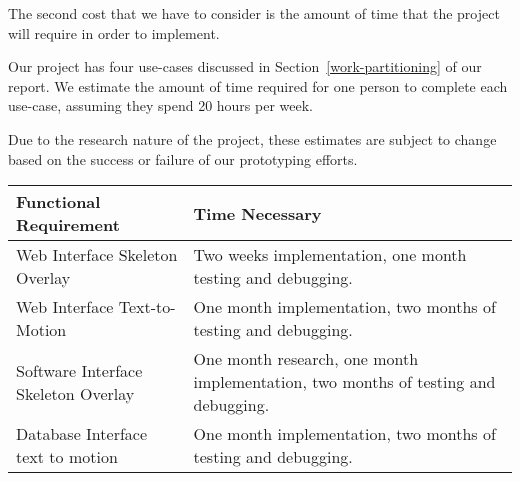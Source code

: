 \documentclass{scrreprt}
\begin{document}
{The second cost that we have to consider is the amount of time that the
project will require in order to implement. }

{Our project has four use-cases discussed in Section~\ref{work-partitioning} of
our report. We estimate the amount of time required for one person to complete
each use-case, assuming they spend 20 hours per week.}

Due to the research nature of the project, these estimates are subject to
change based on the success or failure of our prototyping efforts.

\begin{longtable}[c]{@{}ll@{}}
\toprule
\begin{minipage}[t]{0.47\columnwidth}\raggedright\strut
{Functional Requirement}
\strut\end{minipage} &
\begin{minipage}[t]{0.47\columnwidth}\raggedright\strut
{Time Necessary}
\strut\end{minipage}\tabularnewline\midrule
\begin{minipage}[t]{0.47\columnwidth}\raggedright\strut
{Web Interface Skeleton Overlay}
\strut\end{minipage} &
\begin{minipage}[t]{0.47\columnwidth}\raggedright\strut
{Two weeks implementation, one month testing and debugging.}
\strut\end{minipage}\tabularnewline
\begin{minipage}[t]{0.47\columnwidth}\raggedright\strut
{Web Interface Text-to-Motion}
\strut\end{minipage} &
\begin{minipage}[t]{0.47\columnwidth}\raggedright\strut
{One month implementation, two months of testing and debugging.}
\strut\end{minipage}\tabularnewline
\begin{minipage}[t]{0.47\columnwidth}\raggedright\strut
{Software Interface Skeleton Overlay}
\strut\end{minipage} &
\begin{minipage}[t]{0.47\columnwidth}\raggedright\strut
{One month research, one month implementation, two months of testing and
        debugging.}
\strut\end{minipage}\tabularnewline
\begin{minipage}[t]{0.47\columnwidth}\raggedright\strut
{Database Interface text to motion}
\strut\end{minipage} &
\begin{minipage}[t]{0.47\columnwidth}\raggedright\strut
{One month implementation, two months of testing and debugging.}
\strut\end{minipage}\tabularnewline
\bottomrule
\end{longtable}
\end{document}

